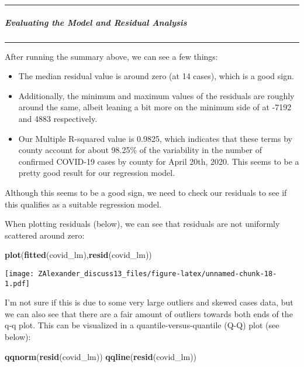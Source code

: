 \documentclass[
]{article}
\newenvironment{Shaded}{\begin{snugshade}}{\end{snugshade}}
\newcommand{\KeywordTok}[1]{\textcolor[rgb]{0.13,0.29,0.53}{\textbf{#1}}}
\newcommand{\NormalTok}[1]{#1}
\begin{document}
\begin{center}\rule{0.5\linewidth}{0.5pt}\end{center}

\hypertarget{evaluating-the-model-and-residual-analysis}{%
\subparagraph{Evaluating the Model and Residual
Analysis}\label{evaluating-the-model-and-residual-analysis}}

\begin{center}\rule{0.5\linewidth}{0.5pt}\end{center}

After running the summary above, we can see a few things:

\begin{itemize}
\item
  The median residual value is around zero (at 14 cases), which is a
  good sign.
\item
  Additionally, the minimum and maximum values of the residuals are
  roughly around the same, albeit leaning a bit more on the minimum side
  of at -7192 and 4883 respectively.
\item
  Our Multiple R-squared value is 0.9825, which indicates that these
  terms by county account for about 98.25\% of the variability in the
  number of confirmed COVID-19 cases by county for April 20th, 2020.
  This seems to be a pretty good result for our regression model.
\end{itemize}

Although this seems to be a good sign, we need to check our residuals to
see if this qualifies as a suitable regression model.

When plotting residuals (below), we can see that residuals are not
uniformly scattered around zero:

\begin{Shaded}
\begin{Highlighting}[]
\KeywordTok{plot}\NormalTok{(}\KeywordTok{fitted}\NormalTok{(covid_lm),}\KeywordTok{resid}\NormalTok{(covid_lm))}
\end{Highlighting}
\end{Shaded}

\texttt{[image: ZAlexander\_discuss13\_files/figure-latex/unnamed-chunk-18-1.pdf]}

I'm not sure if this is due to some very large outliers and skewed cases
data, but we can also see that there are a fair amount of outliers
towards both ends of the q-q plot. This can be visualized in a
quantile-versus-quantile (Q-Q) plot (see below):

\begin{Shaded}
\begin{Highlighting}[]
\KeywordTok{qqnorm}\NormalTok{(}\KeywordTok{resid}\NormalTok{(covid_lm))}
\KeywordTok{qqline}\NormalTok{(}\KeywordTok{resid}\NormalTok{(covid_lm))}
\end{Highlighting}
\end{Shaded}
\end{document}
